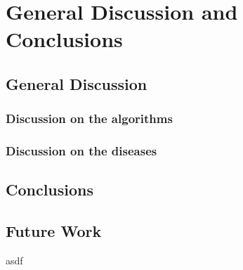 \chapter{General Discussion and Conclusions}\label{ch:discusion}
\section{General Discussion}
\subsection{Discussion on the algorithms}

\subsection{Discussion on the diseases}

\section{Conclusions}

\section{Future Work}


asdf